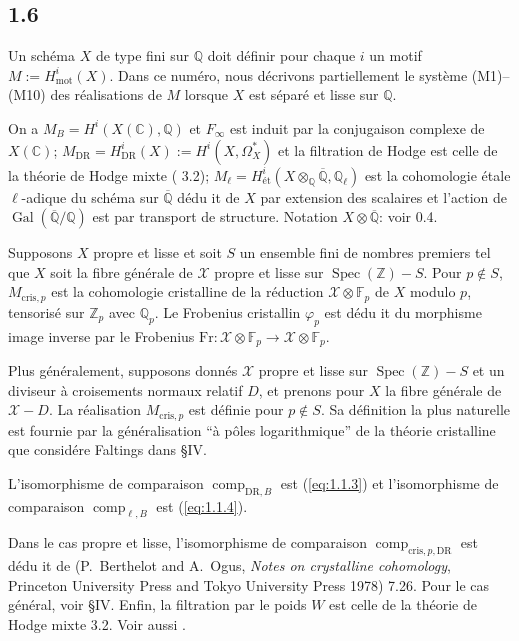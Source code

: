 \documentclass[12pt,a4paper]{article}
\theoremstyle{plain}
\theoremstyle{definition}
\theoremstyle{remark}
\DeclareMathOperator{\Spec}{Spec}
\DeclareMathOperator{\Gal}{Gal}
\newcommand{\mot}{\mathrm{mot}}
\providecommand{\Gal}{\operatorname{Gal}}
\providecommand{\Spec}{\operatorname{Spec}}
\providecommand{\mot}{\mathrm{mot}}
\providecommand{\DR}{\mathrm{DR}}
\providecommand{\cris}{\mathrm{cris}}
\providecommand{\comp}{\operatorname{comp}}
\begin{document}
\subsection*{1.6}

Un sch\'ema $X$ de type fini sur $\mathbb{Q}$ doit d\'efinir pour chaque $i$ un motif
$M := H^i_\mot(X)$. Dans ce num\'ero, nous d\'ecrivons partiellement le syst\`eme
(M1)--(M10) des r\'ealisations de $M$ lorsque $X$ est s\'epar\'e et lisse sur $\mathbb{Q}$.

On a $M_B = H^i(X(\mathbb{C}), \mathbb{Q})$ et $F_\infty$ est induit par la conjugaison
complexe de $X(\mathbb{C})$; $M_{\DR} = H^i_{\DR}(X) := H^i(X, \Omega_X^*)$ et la
filtration de Hodge est celle de la th\'eorie de Hodge mixte (\cite{D2} 3.2);
$M_\ell = H^i_\text{\'et}(X \otimes_{\mathbb{Q}} \overline{\mathbb{Q}}, \mathbb{Q}_\ell)$ est la
cohomologie \'etale $\ell$-adique du sch\'ema sur $\overline{\mathbb{Q}}$ d\'edu it de $X$ par
extension des scalaires et l'action de $\Gal(\overline{\mathbb{Q}}/\mathbb{Q})$ est par transport
de structure. Notation $X \otimes \overline{\mathbb{Q}}$: voir 0.4.

Supposons $X$ propre et lisse et soit $S$ un ensemble fini de nombres premiers tel que
$X$ soit la fibre g\'en\'erale de $\mathcal{X}$ propre et lisse sur $\Spec(\mathbb{Z}) - S$.
Pour $p \notin S$, $M_{\cris,p}$ est la cohomologie cristalline de la r\'eduction
$\mathcal{X} \otimes \mathbb{F}_p$ de $X$ modulo $p$, tensoris\'e sur $\mathbb{Z}_p$ avec
$\mathbb{Q}_p$. Le Frobenius cristallin $\varphi_p$ est d\'edu it du morphisme image
inverse par le Frobenius $\text{Fr}: \mathcal{X} \otimes \mathbb{F}_p \to
\mathcal{X} \otimes \mathbb{F}_p$.

Plus g\'en\'eralement, supposons donn\'es $\mathcal{X}$ propre et lisse sur
$\Spec(\mathbb{Z}) - S$ et un diviseur \`a croisements normaux relatif $D$, et prenons
pour $X$ la fibre g\'en\'erale de $\mathcal{X} - D$. La r\'ealisation $M_{\cris,p}$ est
d\'efinie pour $p \notin S$. Sa d\'efinition la plus naturelle est fournie par la
g\'en\'eralisation ``\`a p\^oles logarithmique'' de la th\'eorie cristalline que consid\'ere
Faltings dans \cite{Fa} \S IV.

L'isomorphisme de comparaison $\comp_{\DR,B}$ est (\ref{eq:1.1.3}) et l'isomorphisme de
comparaison $\comp_{\ell,B}$ est (\ref{eq:1.1.4}).

Dans le cas propre et lisse, l'isomorphisme de comparaison
$\comp_{\cris,p,\DR}$ est d\'edu it de (P.~Berthelot and A.~Ogus, \textit{Notes on
crystalline cohomology}, Princeton University Press and Tokyo University Press 1978) 7.26.
Pour le cas g\'en\'eral, voir \cite{Fa} \S IV. Enfin, la filtration par le poids $W$ est
celle de la th\'eorie de Hodge mixte \cite{D2} 3.2. Voir aussi \cite{D5}.
\end{document}
